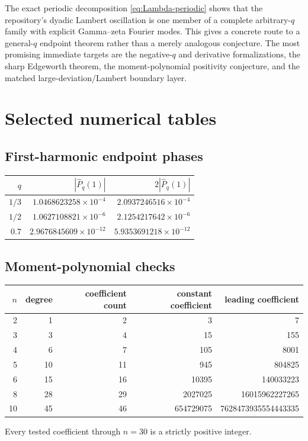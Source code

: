 \documentclass[11pt]{article}
\theoremstyle{definition}
\theoremstyle{remark}
\begin{document}
The exact periodic decomposition \cref{eq:Lambda-periodic} shows that the repository's dyadic Lambert oscillation is one member of a complete arbitrary-$q$ family with explicit Gamma--zeta Fourier modes.  This gives a concrete route to a general-$q$ endpoint theorem rather than a merely analogous conjecture.  The most promising immediate targets are the negative-$q$ and derivative formalizations, the sharp Edgeworth theorem, the moment-polynomial positivity conjecture, and the matched large-deviation/Lambert boundary layer.

\appendix

\section{Selected numerical tables}

\subsection{First-harmonic endpoint phases}

\begin{center}
\begin{tabular}{rrr}
\toprule
$q$ & $|\widehat P_q(1)|$ & $2|\widehat P_q(1)|$\\
\midrule
$1/3$ & $1.0468623258\times10^{-4}$ & $2.0937246516\times10^{-4}$\\
$1/2$ & $1.0627108821\times10^{-6}$ & $2.1254217642\times10^{-6}$\\
$0.7$ & $2.9676845609\times10^{-12}$ & $5.9353691218\times10^{-12}$\\
\bottomrule
\end{tabular}
\end{center}

\subsection{Moment-polynomial checks}

\begin{center}
\begin{tabular}{rrrrr}
\toprule
$n$ & degree & coefficient count & constant coefficient & leading coefficient\\
\midrule
2 & 1 & 2 & 3 & 7\\
3 & 3 & 4 & 15 & 155\\
4 & 6 & 7 & 105 & 8001\\
5 & 10 & 11 & 945 & 804825\\
6 & 15 & 16 & 10395 & 140033223\\
8 & 28 & 29 & 2027025 & 16015962227265\\
10 & 45 & 46 & 654729075 & 7628473935554443335\\
\bottomrule
\end{tabular}
\end{center}
Every tested coefficient through $n=30$ is a strictly positive integer.
\end{document}
